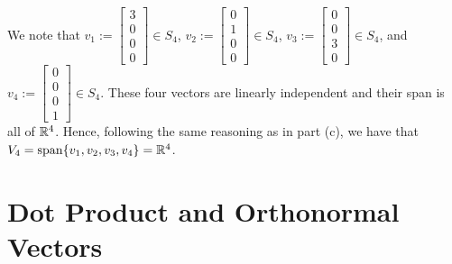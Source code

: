 \begin{enumerate}
  We note that $v_1:=\left[\begin{array}{c} 3 \\ 0 \\ 0 \\ 0 \end{array}\right] \in S_4$,  $v_2:=\left[\begin{array}{c} 0 \\ 1 \\ 0 \\ 0 \end{array}\right] \in S_4$, $v_3:=\left[\begin{array}{c} 0 \\ 0 \\3 \\ 0 \end{array}\right] \in S_4$, and $v_4:=\left[\begin{array}{c} 0 \\ 0 \\0 \\ 1 \end{array}\right] \in S_4$. These four vectors are linearly independent and their span is all of $\mathbb R^4$. Hence, following the same reasoning as in part (c), we have that $V_4 = \mathrm{span} \{ v_1, v_2, v_3, v_4  \} = \mathbb R^4$.

  

\end{enumerate}

\Qed


\section{Dot Product and Orthonormal Vectors} 
\label{sec:OrthognalStuff}


